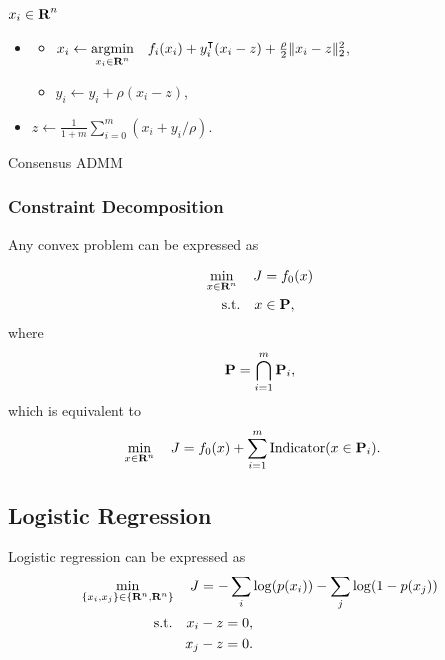 \documentclass{article}
\begin{document}
    \begin{algorithm}[H]
        \SetAlgoLined
        $x_i\in\textbf{R}^n$\\
        {
            \begin{itemize}
                \item 
                {
                    \begin{itemize}\ListBullet
                        \item 
                        $x_i\leftarrow \underset{x_i\in\textbf{R}^n}{\text{argmin}} \quad f_i(x_i)
                        +y_i^\intercal(x_i-z)
                        +\frac{\rho}{2}\|x_i-z\|_2^2$,
                        \item 
                        $y_i\leftarrow y_i+\rho (x_i-z)$,
                    \end{itemize}
                }  
                \item $z\leftarrow \frac{1}{1+m}\sum_{i=0}^{m}(x_i+y_i/\rho)$.
            \end{itemize}
        }
    \caption{Consensus ADMM}
    \label{algo:ADMM_consensus}
    \end{algorithm}

\subsubsection{Constraint Decomposition}

    Any convex problem can be expressed as

    \begin{align*}
        \min_{x\in\textbf{R}^n}\quad J&=f_0(x)\\
        \text{s.t.}\quad x&\in \textbf{P},
    \end{align*}
    where
    \begin{align*}
        \textbf{P} = \bigcap_{i=1}^m \textbf{P}_i,
    \end{align*}
    which is equivalent to
    \begin{align}
        \min_{x\in\textbf{R}^n}\quad J&=f_0(x)+\sum_{i=1}^m \text{Indicator}(x\in \textbf{P}_i).
    \end{align}

\subsection{Logistic Regression}

    Logistic regression can be expressed as
    \begin{align*}
        \min_{\{x_i,x_j\}\in\{\textbf{R}^n,\textbf{R}^n\}}\quad J &= -\sum_i \log(p(x_i))-\sum_j\log(1-p(x_j))\\
        \text{s.t.}\quad x_i&-z=0,\\
        x_j&-z=0.
    \end{align*}
\end{document}
